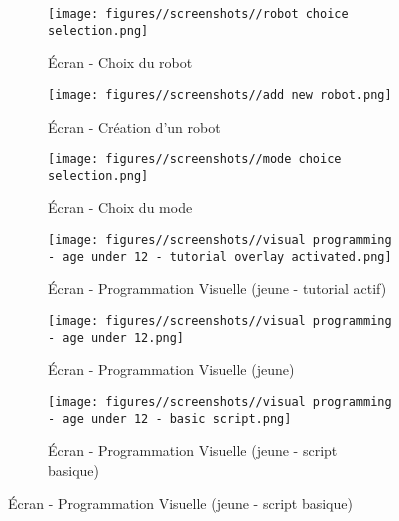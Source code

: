 \begin{figure}[H]
    \centering

    \begin{subfigure}{0.45\linewidth}
        \centering
        \texttt{[image: figures//screenshots//robot choice selection.png]}
        \caption{\label{fig:robot_choice} Écran - Choix du robot}
    \end{subfigure}
    \hfill
    \begin{subfigure}{0.45\linewidth}
        \centering
        \texttt{[image: figures//screenshots//add new robot.png]}
        \caption{\label{fig:add_robot_dialog} Écran - Création d'un robot}
    \end{subfigure}

    \vspace{0.25cm}

    \begin{subfigure}{0.45\linewidth}
        \centering
        \texttt{[image: figures//screenshots//mode choice selection.png]}
        \caption{\label{fig:mode_choice} Écran - Choix du mode}
    \end{subfigure}
    \hfill
    \begin{subfigure}{0.45\linewidth}
        \centering
        \texttt{[image: figures//screenshots//visual programming - age under 12 - tutorial overlay activated.png]}
        \caption{\label{fig:vp_ageunder12_tutoactivated} Écran - Programmation Visuelle (jeune - tutorial actif)}
    \end{subfigure}

    \vspace{0.25cm}

    \begin{subfigure}{0.45\linewidth}
        \centering
        \texttt{[image: figures//screenshots//visual programming - age under 12.png]}
        \caption{\label{fig:vp_ageunder12} Écran - Programmation Visuelle (jeune)}
    \end{subfigure}
    \hfill
    \begin{subfigure}{0.45\linewidth}
        \centering
        \texttt{[image: figures//screenshots//visual programming - age under 12 - basic script.png]}
        \caption{\label{fig:vp_ageunder12_basic script} Écran - Programmation Visuelle (jeune - script basique)}
    \end{subfigure}

    \vspace{0.25cm}


\end{figure}
